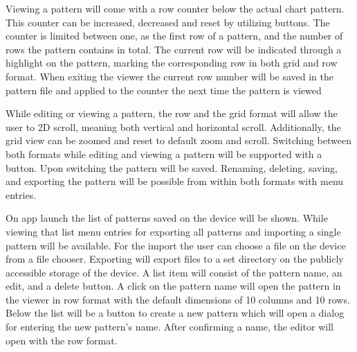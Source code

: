 Viewing a pattern will come with a row counter below the actual chart pattern. This counter can be increased, decreased and reset by utilizing buttons. The counter is limited between one, as the first row of a pattern, and the number of rows the pattern contains in total. The current row will be indicated through a highlight on the pattern, marking the corresponding row in both grid and row format. When exiting the viewer the current row number will be saved in the pattern file and applied to the counter the next time the pattern is viewed

While editing or viewing a pattern, the row and the grid format will allow the user to 2D scroll, meaning both vertical and horizontal scroll. Additionally, the grid view can be zoomed and reset to default zoom and scroll. Switching between both formats while editing and viewing a pattern will be supported with a button. Upon switching the pattern will be saved. Renaming, deleting, saving, and exporting the pattern will be possible from within both formats with menu entries.

On app launch the list of patterns saved on the device will be shown. While viewing that list menu entries for exporting all patterns and importing a single pattern will be available. For the import the user can choose a file on the device from a file chooser. Exporting will export files to a set directory on the publicly accessible storage of the device. A list item will consist of the pattern name, an edit, and a delete button. A click on the pattern name will open the pattern in the viewer in row format with the default dimensions of 10 columns and 10 rows. Below the list will be a button to create a new pattern which will open a dialog for entering the new pattern’s name. After confirming a name, the editor will open with the row format.

